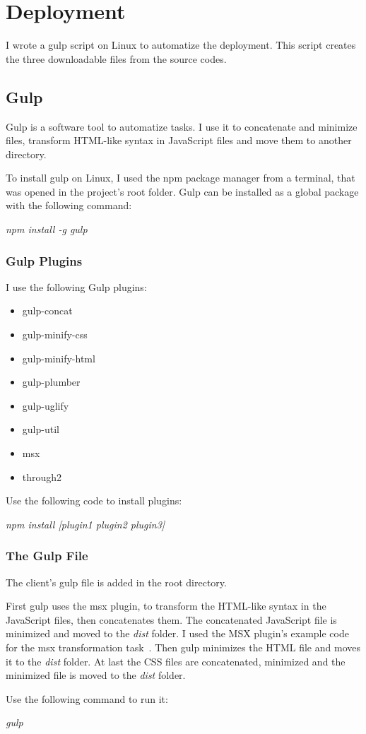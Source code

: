 \chapter{Deployment}
I wrote a gulp script on Linux to automatize the deployment. This script creates the three downloadable files from the source codes.

\section{Gulp}
\label{gulp}

Gulp is a software tool to automatize tasks. I use it to concatenate and minimize files, transform HTML-like syntax in JavaScript files and move them to another directory.

To install gulp on Linux, I used the npm package manager from a terminal, that was opened in the project's root folder. Gulp can be installed as a global package with the following command:

\emph{npm install -g gulp}

\subsection{Gulp Plugins}

I use the following Gulp plugins:

\begin{itemize}
	\item gulp-concat
	\item gulp-minify-css
	\item gulp-minify-html
	\item gulp-plumber		
	\item gulp-uglify
	\item gulp-util
	\item msx
	\item through2
\end{itemize}
	
Use the following code to install plugins:

\emph{npm install [plugin1 plugin2 plugin3]}

\subsection{The Gulp File}
The client's gulp file is added in the root directory. 

First gulp uses the msx plugin, to transform the HTML-like syntax in the JavaScript files, then concatenates them. The concatenated JavaScript file is minimized and moved to the \emph{dist} folder. I used the MSX plugin's example code for the msx transformation task~\cite{gulp-msx-example}. Then gulp minimizes the HTML file and moves it to the \emph{dist} folder. At last the CSS files are concatenated, minimized and the minimized file is moved to the \emph{dist} folder.

Use the following command to run it:

\emph{gulp}